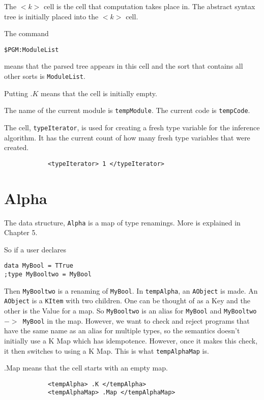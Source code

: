 The \texttt{$<k>$} cell is the cell that computation takes place in.
The abstract syntax tree is initially placed into the \texttt{$<k>$} cell.

The command

\begin{lstlisting}
$PGM:ModuleList
\end{lstlisting}

means that the parsed tree appears in this cell and the sort that contains all other sorts is \texttt{ModuleList}.

Putting \texttt{$.K$} means that the cell is initially empty.

The name of the current module is \texttt{tempModule}. The current code is \texttt{tempCode}.

The cell, \texttt{typeIterator}, is used for creating a fresh type variable for the inference algorithm. It has the current count of how many fresh type variables that were created.

\begin{lstlisting}
            <typeIterator> 1 </typeIterator>
\end{lstlisting}

\section{Alpha}
The data structure, \texttt{Alpha} is a map of type renamings. More is explained in Chapter 5.

So if a user declares

\begin{lstlisting}
data MyBool = TTrue
;type MyBooltwo = MyBool
\end{lstlisting}

Then \texttt{MyBooltwo} is a renaming of \texttt{MyBool}. In \texttt{tempAlpha}, an \texttt{AObject} is made. An \texttt{AObject} is a \texttt{KItem} with two children. One can be thought of as a Key and the other is the Value for a map. So \texttt{MyBooltwo} is an alias for \texttt{MyBool} and \texttt{MyBooltwo $->$ MyBool} in the map. However, we want to check and reject programs that have the same name as an alias for multiple types, so the semantics doesn't initially use a K Map which has idempotence. However, once it makes this check, it then switches to using a K Map. This is what \texttt{tempAlphaMap} is.

.Map means that the cell starts with an empty map.

\begin{lstlisting}
            <tempAlpha> .K </tempAlpha>
            <tempAlphaMap> .Map </tempAlphaMap>
\end{lstlisting}

